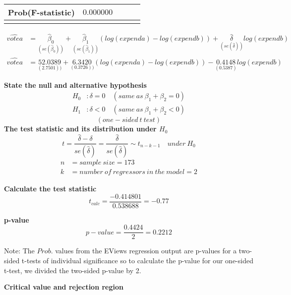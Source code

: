 \documentclass[12pt]{report}
\begin{document}
\begin{table}[H]
\begin{tabular}{lrrrr}
		\multicolumn{1}{l}{Prob(F-statistic)}&\multicolumn{1}{r}{$0.000000$}&\multicolumn{1}{c}{}&\multicolumn{1}{c}{}&\multicolumn{1}{c}{}\\
		[4.5pt] \hline \\ [-4.5pt]
	\end{tabular}
\end{table} \begin{align*}
	\widehat{votea} &= \underset{(se(\hat{\beta}_0))}{\hat{\beta}_0} + \underset{(se(\hat{\beta}_1))}{\hat{\beta}_1}(log(expenda)-log(expendb)) + \underset{(se(\hat{\delta}))}{\hat{\delta}}log(expendb) \\ 
	\widehat{votea} &= \underset{(2.7501))}{52.0389} + \underset{(0.3726))}{6.3420}(log(expenda)-log(expendb)) - \underset{(0.5387)}{0.4148}log(expendb)
\end{align*}

\noindent \textbf{State the null and alternative hypothesis}
\begin{align*}
H_0&: \delta = 0 \quad (same\ as\ \beta_1 + \beta_2 = 0) \\
H_1&: \delta < 0 \quad (same\ as\ \beta_1 + \beta_2 < 0)
\end{align*}
$$(one-sided\ t\ test)$$
\noindent \textbf{The test statistic and its distribution under $H_0$}
$$t = \dfrac{\hat{\delta} - \delta}{se(\hat{\delta})} = \dfrac{\hat{\delta}}{se(\hat{\delta})} \sim t_{n-k-1} \quad under\ H_0$$
\begin{align*}
n &= sample\ size = 173 \\
k &= number\ of\ regressors\ in\ the\ model = 2
\end{align*}

\noindent \textbf{Calculate the test statistic}
$$t_{calc} = \dfrac{-0.414801}{0.538688} = -0.77$$


\noindent \textbf{p-value}
$$p-value = \dfrac{0.4424}{2} = 0.2212$$

\noindent Note: The $Prob.$ values from the EViews regression output are p-values for a two-sided t-tests of individual significance so to calculate the p-value for our one-sided t-test, we divided the two-sided p-value by 2.

\begin{figure}[H]
	\centering
\end{figure}
\vspace{-\baselineskip}

\noindent \textbf{Critical value and rejection region}
\end{document}
